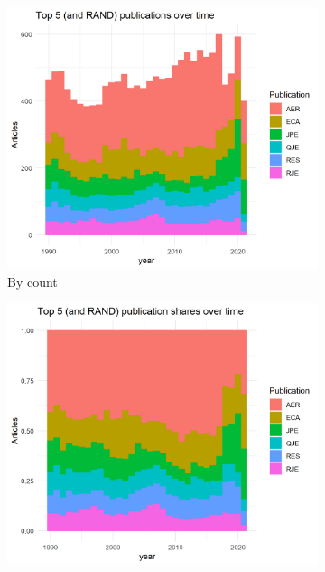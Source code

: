\documentclass[11pt, letterpaper, twoside]{article}
\begin{document}
\begin{figure}[h]
    \caption{Annual publications in the Top 5 (and RAND)}
    \begin{subfigure}[h]{0.49\textwidth}
        \centering
        \includegraphics[width=\textwidth]{top_5_over_time_col.png}
        \caption{By count}
    \end{subfigure}
    \hfill
    \begin{subfigure}[h]{0.49\textwidth}
        \centering
        \includegraphics[width=\textwidth]{top_5_over_time_col_shares.png}

\end{subfigure}
\end{figure}
\end{document}
